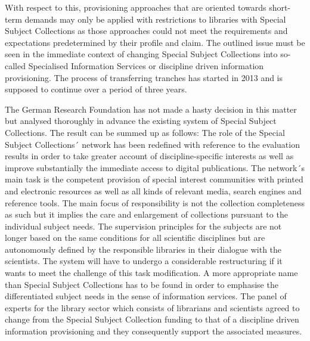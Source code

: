 \documentclass[a4paper,
fontsize=11pt,
oneside,
numbers=noperiodatend,
parskip=half-,
bibliography=totoc,
final
]{scrartcl}
\begin{document}
With respect to this, provisioning approaches that are oriented towards
short-term demands may only be applied with restrictions to libraries
with Special Subject Collections as those approaches could not meet the
requirements and expectations predetermined by their profile and claim.
The outlined issue must be seen in the immediate context of changing
Special Subject Collections into so-called Specialised Information
Services or discipline driven information provisioning. The process of
transferring tranches has started in 2013 and is supposed to continue
over a period of three years.

The German Research Foundation has not made a hasty decision in this
matter but analysed thoroughly in advance the existing system of Special
Subject Collections. The result can be summed up as follows: The role of
the Special Subject Collections´ network has been redefined with
reference to the evaluation results in order to take greater account of
discipline-specific interests as well as improve substantially the
immediate access to digital publications. The network´s main task is the
competent provision of special interest communities with printed and
electronic resources as well as all kinds of relevant media, search
engines and reference tools. The main focus of responsibility is not the
collection completeness as such but it implies the care and enlargement
of collections pursuant to the individual subject needs. The supervision
principles for the subjects are not longer based on the same conditions
for all scientific disciplines but are autonomously defined by the
responsible libraries in their dialogue with the scientists. The system
will have to undergo a considerable restructuring if it wants to meet
the challenge of this task modification. A more appropriate name than
Special Subject Collections has to be found in order to emphasise the
differentiated subject needs in the sense of information services. The
panel of experts for the library sector which consists of librarians and
scientists agreed to change from the Special Subject Collection funding
to that of a discipline driven information provisioning and they
consequently support the associated measures.
\end{document}
